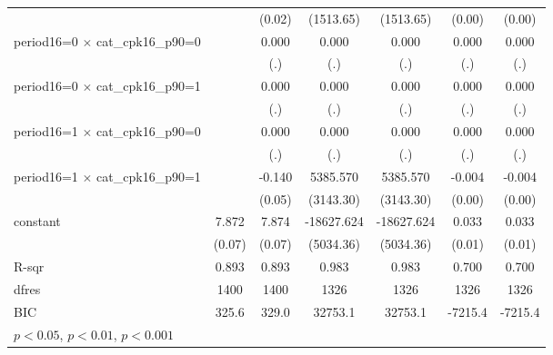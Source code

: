 {\begin{tabular}{l*{6}{c}}
                    &                     &      (0.02)         &   (1513.65)         &   (1513.65)         &      (0.00)         &      (0.00)         \\
period16=0 $\times$ cat\_cpk16\_p90=0&                     &       0.000         &       0.000         &       0.000         &       0.000         &       0.000         \\
                    &                     &         (.)         &         (.)         &         (.)         &         (.)         &         (.)         \\
period16=0 $\times$ cat\_cpk16\_p90=1&                     &       0.000         &       0.000         &       0.000         &       0.000         &       0.000         \\
                    &                     &         (.)         &         (.)         &         (.)         &         (.)         &         (.)         \\
period16=1 $\times$ cat\_cpk16\_p90=0&                     &       0.000         &       0.000         &       0.000         &       0.000         &       0.000         \\
                    &                     &         (.)         &         (.)         &         (.)         &         (.)         &         (.)         \\
period16=1 $\times$ cat\_cpk16\_p90=1&                     &      -0.140\sym{**} &    5385.570         &    5385.570         &      -0.004         &      -0.004         \\
                    &                     &      (0.05)         &   (3143.30)         &   (3143.30)         &      (0.00)         &      (0.00)         \\
constant            &       7.872\sym{***}&       7.874\sym{***}&  -18627.624\sym{***}&  -18627.624\sym{***}&       0.033\sym{***}&       0.033\sym{***}\\
                    &      (0.07)         &      (0.07)         &   (5034.36)         &   (5034.36)         &      (0.01)         &      (0.01)         \\
\hline
R-sqr               &       0.893         &       0.893         &       0.983         &       0.983         &       0.700         &       0.700         \\
dfres               &        1400         &        1400         &        1326         &        1326         &        1326         &        1326         \\
BIC                 &       325.6         &       329.0         &     32753.1         &     32753.1         &     -7215.4         &     -7215.4         \\
\hline\hline
\multicolumn{7}{l}{\footnotesize \sym{*} \(p<0.05\), \sym{**} \(p<0.01\), \sym{***} \(p<0.001\)}\\
\end{tabular}
}
